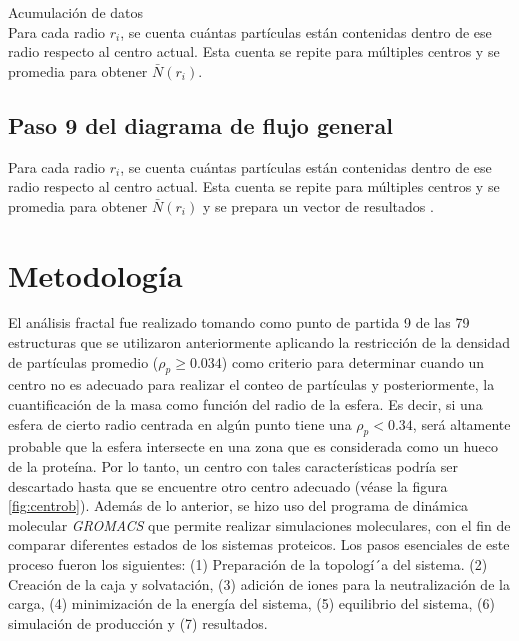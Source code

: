 	Acumulaci\'{o}n de datos\\
	Para cada radio \( r_i \), se cuenta cu\'{a}ntas part\'{i}culas est\'{a}n contenidas dentro de ese radio respecto al centro actual. Esta cuenta se repite para m\'{u}ltiples centros y se promedia para obtener \(\bar{N}(r_i)\).


	

 	
 	\subsection{Paso 9 del diagrama de flujo general}
 		

 	Para cada radio \( r_i \), se cuenta cu\'{a}ntas part\'{i}culas est\'{a}n contenidas dentro de ese radio respecto al centro actual. Esta cuenta se repite para m\'{u}ltiples centros y se promedia para obtener \( \bar{N}(r_i) \)	y se prepara un vector de resultados .
 
 
 
 	\clearpage
 		
 	
 
 	\section{Metodolog\'{i}a}
 	\label{met}
 	
 	El an\'{a}lisis fractal fue realizado tomando como punto de partida 9 de las 79 estructuras que se utilizaron anteriormente aplicando la restricci\'{o}n de la densidad de part\'{i}culas  promedio ($\rho_{p} \geq 0.034$) como criterio para determinar cuando un centro no es adecuado para realizar el conteo de part\'{i}culas y posteriormente, la cuantificaci\'{o}n de la masa como funci\'{o}n del radio de la esfera. Es decir, si una esfera de cierto radio centrada en alg\'{u}n punto tiene una $\rho_{p} < 0.34$, ser\'{a} altamente probable que la esfera intersecte en una zona que es considerada como un hueco de la prote\'{i}na. Por lo tanto, un centro con tales caracter\'{i}sticas podr\'{i}a ser descartado hasta que se encuentre otro centro adecuado (v\'{e}ase la figura \ref{fig:centrob}). Adem\'{a}s de lo anterior, se hizo uso del programa de din\'{a}mica molecular \textit{GROMACS}\cite{Lemkul2024, Abraham2015} que permite realizar simulaciones moleculares, con el fin de comparar diferentes estados de los sistemas proteicos. Los pasos esenciales de este proceso fueron los siguientes: (1) Preparaci\'{o}n de la topolog\'{i´}a del sistema. (2) Creaci\'{o}n de la caja y solvataci\'{o}n, (3) adici\'{o}n de iones para la neutralizaci\'{o}n de la carga, (4) minimizaci\'{o}n de la energ\'{i}a del sistema, (5) equilibrio del sistema, (6) simulaci\'{o}n de producci\'{o}n y (7) resultados.
 	
